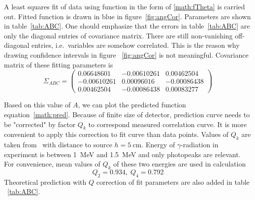A least squares fit of data using function in the form of \eqref{math:fTheta} is carried out. Fitted function is drawn in blue in figure~\ref{fig:angCor}. Parameters are shown in table~\ref{tab:ABC}. One should emphasize that the errors in table~\ref{tab:ABC} are only the diagonal entries of covariance matrix. There are still non-vanishing off-diagonal entries, i.e.~variables are somehow correlated. This is the reason why drawing confidence intervals in figure ~\ref{fig:angCor} is not meaningful. Covariance matrix of these fitting parameters is
\begin{equation}
   \Sigma_{ABC} = \begin{pmatrix} \num{0.06648601} & \num{-0.00610261} & \num{0.00462504} \\
   \num{-0.00610261} & \num{0.00096016} & \num{-0.00086438} \\
\num{0.00462504} & \num{-0.00086438} & \num{0.00083277}\end{pmatrix}
\label{math:Sigma}
\end{equation}

Based on this value of $A$, we can plot the predicted function equation~\eqref{math:pred}. Because of finite size of detector, prediction curve needs to be "corrected" by factor $Q_k$ to correspond measured correlation curve. It is more convenient to apply this correction to fit curve than data points. Values of $Q_k$ are taken from~\cite{siegbahn} with distance to source $h=\SI{5}{\cm}$. Energy of $\gamma$-radiation in experiment is between \SI{1}{\mega\eV} and \SI{1.5}{\mega\eV} and only photopeaks are relevant. For convenience, mean values of $Q_k$ of these two energies are used in calculation
\begin{equation*}
   Q_2 = \num{0.934},\; Q_4 = \num{0.792}
\end{equation*}
Theoretical prediction with $Q$ correction of fit parameters are also added in table ~\ref{tab:ABC}.

